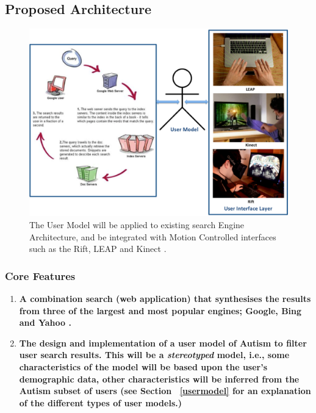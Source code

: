 \documentclass[a4paper, 11pt]{article}
\begin{document}
\begin{justify}
\subsection{Proposed Architecture}\label{proposed}
\begin{figure}[H]
\begin{center}
    \includegraphics[scale=0.3]{searchEngArchi}
    \caption{The User Model will be applied to existing search Engine Architecture\cite{seimage}, and be integrated with Motion Controlled interfaces such as the Rift, LEAP and Kinect \cite{rift, leap, kinect}.}
    \label{architec}
\end{center}
\end{figure}


\subsubsection{Core Features}\label{core}
\begin{enumerate}
\item  \textbf{A combination search (web application) that synthesises the results from three of the largest and most popular engines; Google, Bing and Yahoo \cite{adam}.}

\item \textbf{The design and implementation of a user model of Autism to filter user search results. This will be a \textit{stereotyped} model, i.e., some characteristics of the model will be based upon the user's demographic data, other characteristics will be inferred from the Autism subset of users (see Section ~\ref{usermodel} for an explanation of the different types of user models.)}


\end{enumerate}
\end{justify}
\end{document}
